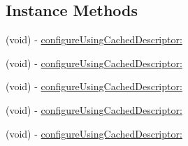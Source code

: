 \subsection*{Instance Methods}
\begin{DoxyCompactItemize}
\item 
(void) -\/ \hyperlink{interfaceFBFriendPickerViewController_aec8ccc14e83ba67dfebf0ffcc09253f8}{configure\+Using\+Cached\+Descriptor\+:}
\item 
(void) -\/ \hyperlink{interfaceFBFriendPickerViewController_aec8ccc14e83ba67dfebf0ffcc09253f8}{configure\+Using\+Cached\+Descriptor\+:}
\item 
(void) -\/ \hyperlink{interfaceFBFriendPickerViewController_aec8ccc14e83ba67dfebf0ffcc09253f8}{configure\+Using\+Cached\+Descriptor\+:}
\item 
(void) -\/ \hyperlink{interfaceFBFriendPickerViewController_aec8ccc14e83ba67dfebf0ffcc09253f8}{configure\+Using\+Cached\+Descriptor\+:}
\item 
(void) -\/ \hyperlink{interfaceFBFriendPickerViewController_aec8ccc14e83ba67dfebf0ffcc09253f8}{configure\+Using\+Cached\+Descriptor\+:}
\end{DoxyCompactItemize}
